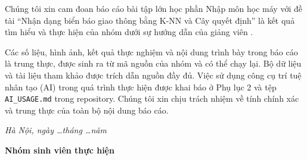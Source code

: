 
Chúng tôi xin cam đoan báo cáo bài tập lớn học phần Nhập môn học máy với đề tài ``Nhận dạng biển báo giao thông bằng K-NN và Cây quyết định'' là kết quả tìm hiểu và thực hiện của nhóm dưới sự hướng dẫn của giảng viên \GiangVienHD.

Các số liệu, hình ảnh, kết quả thực nghiệm và nội dung trình bày trong báo cáo là trung thực, được sinh ra từ mã nguồn của nhóm và có thể chạy lại. Bộ dữ liệu và tài liệu tham khảo được trích dẫn nguồn đầy đủ. Việc sử dụng công cụ trí tuệ nhân tạo (AI) trong quá trình thực hiện được khai báo ở Phụ lục 2 và tệp \texttt{AI\_USAGE.md} trong repository. Chúng tôi xin chịu trách nhiệm về tính chính xác và trung thực của toàn bộ nội dung báo cáo.

\vspace{1cm}

\begin{flushright}
\begin{minipage}{8cm}
\centering
\textit{Hà Nội, ngày \ldots tháng \ldots năm \Nam}

\vspace{0.5cm}

\textbf{Nhóm sinh viên thực hiện}

\vspace{2cm}

\textbf{\TenSinhVien}
\end{minipage}
\end{flushright}
